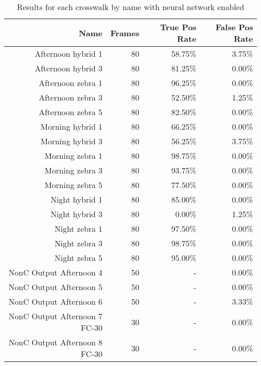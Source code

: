     \begin{longtable}{|r|r|r|r|}
    \caption{Results for each crosswalk by name with neural network enabled}
    \label{tab:appendixcrosswalkresults}\\
    \hline
    Name  & Frames & True Pos Rate & False Pos Rate \bigstrut\\
    \hline
    Afternoon hybrid 1 & 80    & 58.75\% & 3.75\% \bigstrut\\
    \hline
    Afternoon hybrid 3 & 80    & 81.25\% & 0.00\% \bigstrut\\
    \hline
    Afternoon zebra 1 & 80    & 96.25\% & 0.00\% \bigstrut\\
    \hline
    Afternoon zebra 3 & 80    & 52.50\% & 1.25\% \bigstrut\\
    \hline
    Afternoon zebra 5 & 80    & 82.50\% & 0.00\% \bigstrut\\
    \hline
    Morning hybrid 1 & 80    & 66.25\% & 0.00\% \bigstrut\\
    \hline
    Morning hybrid 3 & 80    & 56.25\% & 3.75\% \bigstrut\\
    \hline
    Morning zebra 1 & 80    & 98.75\% & 0.00\% \bigstrut\\
    \hline
    Morning zebra 3 & 80    & 93.75\% & 0.00\% \bigstrut\\
    \hline
    Morning zebra 5 & 80    & 77.50\% & 0.00\% \bigstrut\\
    \hline
    Night hybrid 1 & 80    & 85.00\% & 0.00\% \bigstrut\\
    \hline
    Night hybrid 3 & 80    & 0.00\% & 1.25\% \bigstrut\\
    \hline
    Night zebra 1 & 80    & 97.50\% & 0.00\% \bigstrut\\
    \hline
    Night zebra 3 & 80    & 98.75\% & 0.00\% \bigstrut\\
    \hline
    Night zebra 5 & 80    & 95.00\% & 0.00\% \bigstrut\\
    \hline
    NonC Output Afternoon 4 & 50    & -     & 0.00\% \bigstrut\\
    \hline
    NonC Output Afternoon 5 & 50    & -     & 0.00\% \bigstrut\\
    \hline
    NonC Output Afternoon 6 & 50    & -     & 3.33\% \bigstrut\\
    \hline
    NonC Output Afternoon 7 FC-30 & 30    & -     & 0.00\% \bigstrut\\
    \hline
    NonC Output Afternoon 8 FC-30 & 30    & -     & 0.00\% \bigstrut\\
    \hline

\end{longtable}
